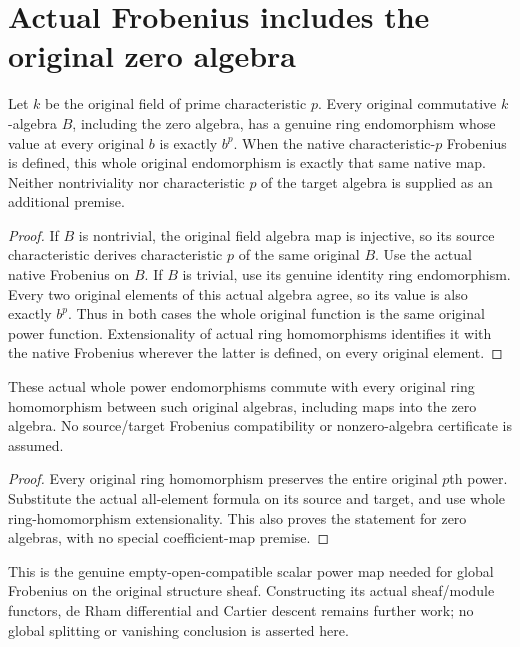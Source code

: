 \section{Actual Frobenius includes the original zero algebra}
\label{sec:algebra-frobenius}

\begin{theorem}
\label{lem:cartier-frobenius-original-zero-algebra}
\leanok
Let $k$ be the original field of prime characteristic $p$.
Every original commutative $k$-algebra $B$, including the zero
algebra, has a genuine ring endomorphism whose value at every
original $b$ is exactly $b^p$. When the native characteristic-$p$
Frobenius is defined, this whole original endomorphism is exactly
that same native map. Neither nontriviality nor characteristic $p$
of the target algebra is supplied as an additional premise.
\end{theorem}
\begin{proof}
If $B$ is nontrivial, the original field algebra map is injective,
so its source characteristic derives characteristic $p$ of the same
original $B$. Use the actual native Frobenius on $B$. If $B$ is
trivial, use its genuine identity ring endomorphism. Every two
original elements of this actual algebra agree, so its value is
also exactly $b^p$. Thus in both cases the whole original function
is the same original power function. Extensionality of actual ring
homomorphisms identifies it with the native Frobenius wherever
the latter is defined, on every original element.
\end{proof}

\begin{theorem}
\label{lem:cartier-frobenius-original-zero-algebra-naturality}
\leanok
These actual whole power endomorphisms commute with every original
ring homomorphism between such original algebras, including maps
into the zero algebra. No source/target Frobenius compatibility or
nonzero-algebra certificate is assumed.
\end{theorem}
\begin{proof}
Every original ring homomorphism preserves the entire original
$p$th power. Substitute the actual all-element formula on its
source and target, and use whole ring-homomorphism extensionality.
This also proves the statement for zero algebras, with no special
coefficient-map premise.
\end{proof}

This is the genuine empty-open-compatible scalar power map needed
for global Frobenius on the original structure sheaf. Constructing
its actual sheaf/module functors, de Rham differential and Cartier
descent remains further work; no global splitting or vanishing
conclusion is asserted here.
